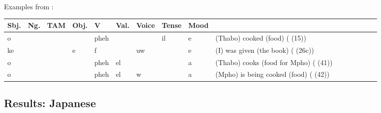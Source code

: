 \documentclass[11pt,letterpaper]{article}
\begin{document}
Examples from \cite{demuth1992acquisition}:

\begin{tabular}{lllllllll|lllllll}
Sbj. & Ng. & TAM & Obj. & V & Val. & Voice & Tense & Mood \\ \hline
o       &          &     &        & pheh &         &       & il    & e  & (Thabo) cooked (food) (\cite{demuth1992acquisition} (15)) \\
ke      &          &     & e      & f   &          & uw    &      & e   & (I) was given (the book) (\cite{demuth1992acquisition} (26c)) \\
o       &          &     &        & pheh & el      &      &       & a & (Thabo) cooks (food for Mpho) (\cite{demuth1992acquisition} (41))\\
o       &          &     &        & pheh & el      & w    &      & a & (Mpho) is being cooked (food) (\cite{demuth1992acquisition} (42))
\end{tabular}





\subsection{Results: Japanese}
\end{document}
